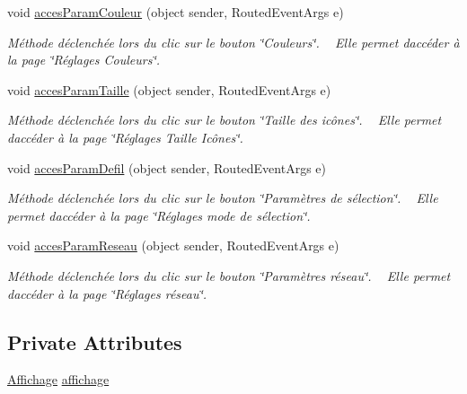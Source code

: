 \begin{DoxyCompactItemize}
void \hyperlink{class_my_domotik_1_1_admin_page_aad822e3f29bab8c84f9b095eb27d5a4c}{acces\+Param\+Couleur} (object sender, Routed\+Event\+Args e)
\begin{DoxyCompactList}\small\item\em Méthode déclenchée lors du clic sur le bouton \char`\"{}\+Couleurs\char`\"{}. ~\newline
Elle permet d\textquotesingle{}accéder à la page \char`\"{}\+Réglages Couleurs\char`\"{}. \end{DoxyCompactList}\item 
void \hyperlink{class_my_domotik_1_1_admin_page_a842023cd4d8349c9813ddcd4e087d974}{acces\+Param\+Taille} (object sender, Routed\+Event\+Args e)
\begin{DoxyCompactList}\small\item\em Méthode déclenchée lors du clic sur le bouton \char`\"{}\+Taille des icônes\char`\"{}. ~\newline
Elle permet d\textquotesingle{}accéder à la page \char`\"{}\+Réglages Taille Icônes\char`\"{}. \end{DoxyCompactList}\item 
void \hyperlink{class_my_domotik_1_1_admin_page_a60f2ba64ab5630e44b06b2742c4c999d}{acces\+Param\+Defil} (object sender, Routed\+Event\+Args e)
\begin{DoxyCompactList}\small\item\em Méthode déclenchée lors du clic sur le bouton \char`\"{}\+Paramètres de sélection\char`\"{}. ~\newline
Elle permet d\textquotesingle{}accéder à la page \char`\"{}\+Réglages mode de sélection\char`\"{}. \end{DoxyCompactList}\item 
void \hyperlink{class_my_domotik_1_1_admin_page_af423129a19690f2bf7883fcae4fc7816}{acces\+Param\+Reseau} (object sender, Routed\+Event\+Args e)
\begin{DoxyCompactList}\small\item\em Méthode déclenchée lors du clic sur le bouton \char`\"{}\+Paramètres réseau\char`\"{}. ~\newline
Elle permet d\textquotesingle{}accéder à la page \char`\"{}\+Réglages réseau\char`\"{}. \end{DoxyCompactList}\end{DoxyCompactItemize}
\subsection*{Private Attributes}
\begin{DoxyCompactItemize}
\item 
\hyperlink{class_my_domotik_1_1_affichage}{Affichage} \hyperlink{class_my_domotik_1_1_admin_page_a3653a24ede0989f52591c70ea6d7014c}{affichage}
\end{DoxyCompactItemize}


